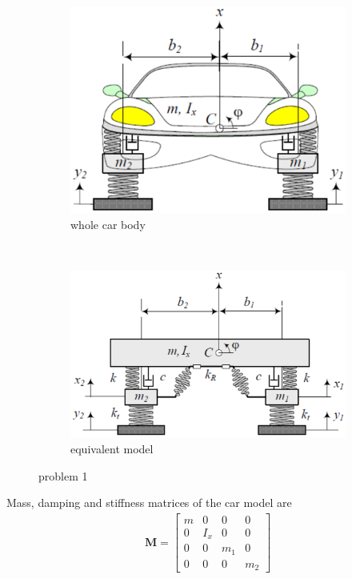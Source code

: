 \documentclass[]{report}
\begin{document}
\begin{figure}[ht!]
\begin{subfigure}[b]{0.5\textwidth}
\includegraphics[width=\textwidth]{./Figures/2st_Assignment} \caption{whole car body}
\end{subfigure}~
\begin{subfigure}[b]{0.5\textwidth}
\includegraphics[width=\textwidth]{./Figures/2st_Assignment_1}
\caption{equivalent model}
\end{subfigure}
\caption{problem 1}
\label{fig:2st_Assignment}
\end{figure}
Mass, damping and stiffness matrices of the car model are
\begin{eqnarray*}
\mathbf{M}=\left[\begin{array}{cccc}
m&0&0&0\\
0&I_x&0&0 \\
0&0&m_1&0 \\
0&0&0&m_2
\end{array}\right]
\end{eqnarray*}
\end{document}
